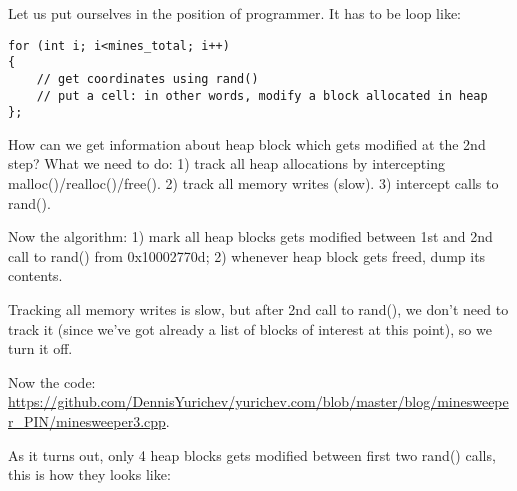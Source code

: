 Let us put ourselves in the position of programmer.
It has to be loop like:

\begin{lstlisting}
for (int i; i<mines_total; i++)
{
	// get coordinates using rand()
	// put a cell: in other words, modify a block allocated in heap
};
\end{lstlisting}

How can we get information about heap block which gets modified at the 2nd step?
What we need to do:
1) track all heap allocations by intercepting malloc()/realloc()/free().
2) track all memory writes (slow).
3) intercept calls to rand().

Now the algorithm:
1) mark all heap blocks gets modified between 1st and 2nd call to rand() from 0x10002770d;
2) whenever heap block gets freed, dump its contents.

Tracking all memory writes is slow, but after 2nd call to rand(), we don't need to track it (since we've got already a list of blocks of interest at this point), so we turn it off.

Now the code: \url{https://github.com/DennisYurichev/yurichev.com/blob/master/blog/minesweeper_PIN/minesweeper3.cpp}.

As it turns out, only 4 heap blocks gets modified between first two rand() calls, this is how they looks like:

